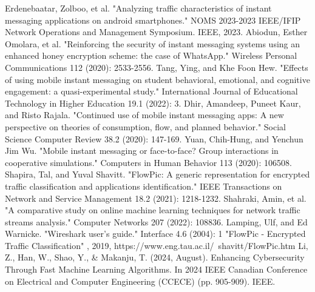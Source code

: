 \documentclass[conference]{IEEEtran}
\begin{document}
\begin{thebibliography}{00}
 Erdenebaatar, Zolboo, et al. "Analyzing traffic characteristics of instant messaging applications on android smartphones." NOMS 2023-2023 IEEE/IFIP Network Operations and Management Symposium. IEEE, 2023.
 Abiodun, Esther Omolara, et al. "Reinforcing the security of instant messaging systems using an enhanced honey encryption scheme: the case of WhatsApp." Wireless Personal Communications 112 (2020): 2533-2556.
 Tang, Ying, and Khe Foon Hew. "Effects of using mobile instant messaging on student behavioral, emotional, and cognitive engagement: a quasi-experimental study." International Journal of Educational Technology in Higher Education 19.1 (2022): 3.
 Dhir, Amandeep, Puneet Kaur, and Risto Rajala. "Continued use of mobile instant messaging apps: A new perspective on theories of consumption, flow, and planned behavior." Social Science Computer Review 38.2 (2020): 147-169.
 Yuan, Chih-Hung, and Yenchun Jim Wu. "Mobile instant messaging or face-to-face? Group interactions in cooperative simulations." Computers in Human Behavior 113 (2020): 106508.
 Shapira, Tal, and Yuval Shavitt. "FlowPic: A generic representation for encrypted traffic classification and applications identification." IEEE Transactions on Network and Service Management 18.2 (2021): 1218-1232.
 Shahraki, Amin, et al. "A comparative study on online machine learning techniques for network traffic streams analysis." Computer Networks 207 (2022): 108836.
 Lamping, Ulf, and Ed Warnicke. "Wireshark user's guide." Interface 4.6 (2004): 1
 "FlowPic - Encrypted Traffic Classification" , 2019, https://www.eng.tau.ac.il/~shavitt/FlowPic.htm
 Li, Z., Han, W., Shao, Y., \& Makanju, T. (2024, August). Enhancing Cybersecurity Through Fast Machine Learning Algorithms. In 2024 IEEE Canadian Conference on Electrical and Computer Engineering (CCECE) (pp. 905-909). IEEE.
\end{thebibliography}
\end{document}
